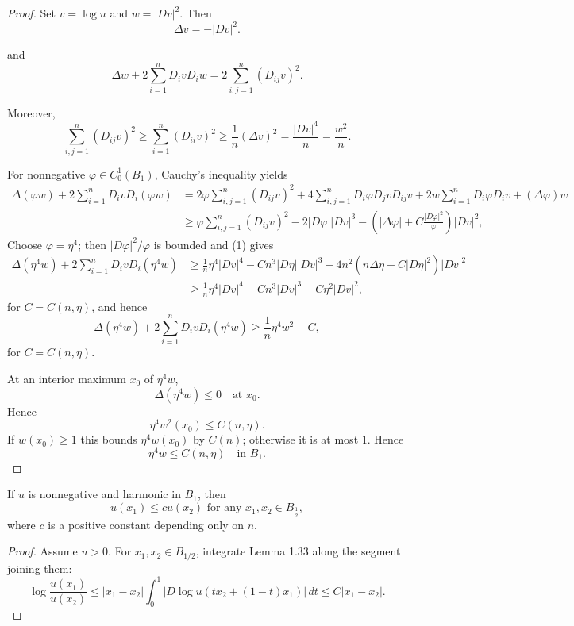 \begin{proof}
\sketch Set $v=\log u$ and $w=|Dv|^2$. Then
\[
\Delta v = -|Dv|^2.
\]

and
\[
\Delta w + 2 \sum_{i=1}^n D_i v D_i w = 2 \sum_{i,j=1}^n (D_{ij}v)^2.
\]

Moreover,
\begin{equation}
\sum_{i,j=1}^n (D_{ij}v)^2 \ge \sum_{i=1}^n (D_{ii}v)^2 \ge \frac{1}{n}(\Delta v)^2 = \frac{|Dv|^4}{n} = \frac{w^2}{n}.
\tag{1}
\end{equation}

For nonnegative $\varphi\in C_0^1(B_1)$, Cauchy's inequality yields
\begin{align*}
\Delta(\varphi w) + 2 \sum_{i=1}^n D_i v D_i(\varphi w)
&= 2\varphi \sum_{i,j=1}^n (D_{ij}v)^2 + 4 \sum_{i,j=1}^n D_i\varphi D_j v D_{ij}v + 2w \sum_{i=1}^n D_i\varphi D_i v + (\Delta\varphi)w \\
&\ge \varphi \sum_{i,j=1}^n (D_{ij}v)^2 - 2|D\varphi||Dv|^3 - \left(|\Delta\varphi| + C\frac{|D\varphi|^2}{\varphi}\right)|Dv|^2,
\end{align*}
Choose $\varphi=\eta^4$; then $|D\varphi|^2/\varphi$ is bounded and (1) gives
\begin{align*}
\Delta(\eta^4 w) + 2 \sum_{i=1}^n D_i v D_i(\eta^4 w)
&\ge \frac{1}{n}\eta^4 |Dv|^4 - Cn^3|D\eta||Dv|^3 - 4n^2(n\Delta\eta + C|D\eta|^2)|Dv|^2 \\
&\ge \frac{1}{n}\eta^4 |Dv|^4 - Cn^3|Dv|^3 - C\eta^2|Dv|^2,
\end{align*}
for $C=C(n,\eta)$, and hence
\[
\Delta(\eta^4 w) + 2 \sum_{i=1}^n D_i v D_i(\eta^4 w) \ge \frac{1}{n}\eta^4 w^2 - C,
\]
for $C=C(n,\eta)$.

At an interior maximum $x_0$ of $\eta^4w$,
\[
\Delta(\eta^4 w) \le 0 \quad \text{at } x_0.
\]
Hence
\[
\eta^4 w^2(x_0) \le C(n,\eta).
\]
If $w(x_0)\ge1$ this bounds $\eta^4w(x_0)$ by $C(n)$; otherwise it is at most
$1$. Hence
\[
\eta^4 w \le C(n,\eta) \quad \text{in } B_1.
\]
\end{proof}

\begin{corollary}\label{hanlin:corollary-harnack-ball}
If $u$ is nonnegative and harmonic in $B_1$, then
\[
u(x_1) \le c u(x_2) \text{ for any } x_1, x_2 \in B_{\frac{1}{2}},
\]
where $c$ is a positive constant depending only on $n$.
\end{corollary}

\begin{proof}
\sketch Assume $u>0$. For $x_1,x_2\in B_{1/2}$, integrate Lemma 1.33 along
the segment joining them:
\[
\log \frac{u(x_1)}{u(x_2)} \le |x_1 - x_2| \int_0^1 |D \log u(tx_2 + (1 - t)x_1)|\,dt \le C|x_1 - x_2|.
\]
\end{proof}

